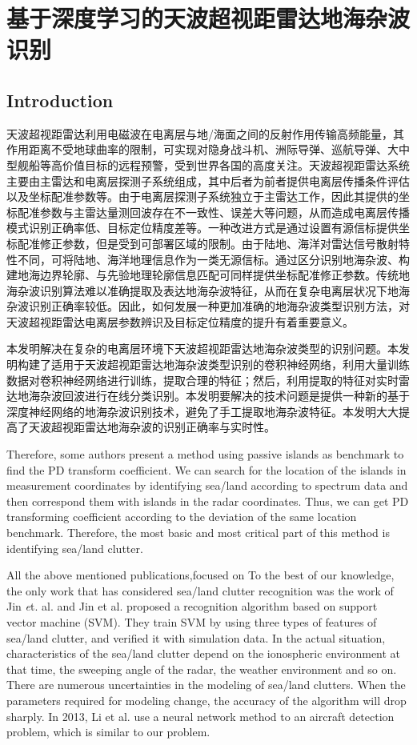 \chapter{基于深度学习的天波超视距雷达地海杂波识别}
\section{Introduction}
%
天波超视距雷达利用电磁波在电离层与地/海面之间的反射作用传输高频能量，其作用距离不受地球曲率的限制，可实现对隐身战斗机、洲际导弹、巡航导弹、大中型舰船等高价值目标的远程预警，受到世界各国的高度关注。天波超视距雷达系统主要由主雷达和电离层探测子系统组成，其中后者为前者提供电离层传播条件评估以及坐标配准参数等。由于电离层探测子系统独立于主雷达工作，因此其提供的坐标配准参数与主雷达量测回波存在不一致性、误差大等问题，从而造成电离层传播模式识别正确率低、目标定位精度差等。一种改进方式是通过设置有源信标提供坐标配准修正参数，但是受到可部署区域的限制。由于陆地、海洋对雷达信号散射特性不同，可将陆地、海洋地理信息作为一类无源信标。通过区分识别地海杂波、构建地海边界轮廓、与先验地理轮廓信息匹配可同样提供坐标配准修正参数。传统地海杂波识别算法难以准确提取及表达地海杂波特征，从而在复杂电离层状况下地海杂波识别正确率较低。因此，如何发展一种更加准确的地海杂波类型识别方法，对天波超视距雷达电离层参数辨识及目标定位精度的提升有着重要意义。

本发明解决在复杂的电离层环境下天波超视距雷达地海杂波类型的识别问题。本发明构建了适用于天波超视距雷达地海杂波类型识别的卷积神经网络，利用大量训练数据对卷积神经网络进行训练，提取合理的特征；然后，利用提取的特征对实时雷达地海杂波回波进行在线分类识别。本发明要解决的技术问题是提供一种新的基于深度神经网络的地海杂波识别技术，避免了手工提取地海杂波特征。本发明大大提高了天波超视距雷达地海杂波的识别正确率与实时性。

Therefore, some authors present a method using passive islands as benchmark to find the PD transform coefficient\cite{cuccoli2011coordinate}. We can search for the location of the islands in measurement coordinates by identifying sea/land according to spectrum data and then correspond them with islands in the radar coordinates. Thus, we can get PD transforming coefficient according to the deviation of the same location benchmark. Therefore, the most basic and most critical part of this method is identifying sea/land clutter.

All the above mentioned publications,focused on To the best of our knowledge, the only work that has considered sea/land clutter recognition was the work of Jin {\emph et. al.} \cite{jin2012svm} and Jin et al. \cite{jin2012svm} proposed a recognition algorithm based on support vector machine (SVM). They train SVM by using three types of features of sea/land clutter, and verified it with simulation data. In the actual situation, characteristics of the sea/land clutter depend on the ionospheric environment at that time, the sweeping angle of the radar, the weather environment and so on. There are numerous uncertainties in the modeling of sea/land clutters. When the parameters required for modeling change, the accuracy of the algorithm will drop sharply. In 2013, Li et al. \cite{li2013high} use a neural network method to an aircraft detection problem, which is similar to our problem.


